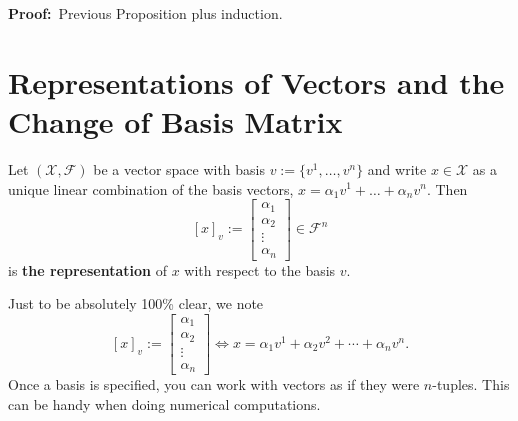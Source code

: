 \textbf{Proof:}~Previous Proposition plus induction. \Qed

    
\section{Representations of Vectors and the Change of Basis Matrix}    
    

\begin{definition}
Let $(\mathcal{X}, \mathcal{F})$ be a vector space with basis $v :=\{v^1, \ldots, v^n\}$ and write $x\in\mathcal{X}$ as a unique linear combination of the basis vectors, $x=\alpha_1v^1+\ldots+\alpha_nv^n$. Then 
$$[x]_v:=
    \begin{bmatrix}\alpha_{1}\\
        \alpha_{2}\\
        \vdots\\
        \alpha_{n}
    \end{bmatrix} \in  \mathcal{F}^n$$
is \textbf{the representation} of $x$ with respect to the basis $v$.  
\end{definition} 


\begin{rem}
Just to be absolutely 100\% clear, we note
$$[x]_v:=
    \begin{bmatrix}\alpha_{1}\\
        \alpha_{2}\\
        \vdots\\
        \alpha_{n}
    \end{bmatrix}  \iff  x=\alpha_1v^1+\alpha_2v^2+\cdots+\alpha_nv^n.$$
    Once a basis is specified, you can work with vectors as if they were $n$-tuples. This can be handy when doing numerical computations.
    
\end{rem} 



